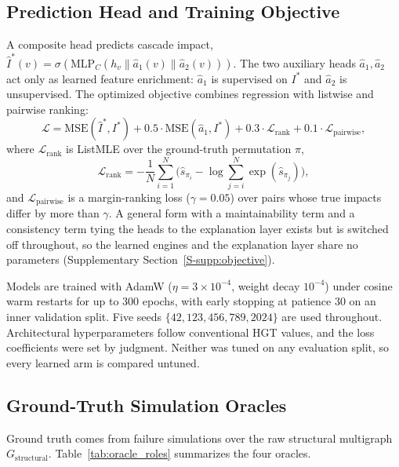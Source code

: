 \documentclass[preprint,3p]{elsarticle}
\begin{document}
\subsection{Prediction Head and Training Objective}
\label{sec:4.2}

A composite head predicts cascade impact, $\hat{I}^*(v) = \sigma(\text{MLP}_C(h_v \parallel \hat{a}_1(v) \parallel \hat{a}_2(v)))$. The two auxiliary heads $\hat{a}_1, \hat{a}_2$ act only as learned feature enrichment: $\hat{a}_1$ is supervised on $I^*$ and $\hat{a}_2$ is unsupervised. The optimized objective combines regression with listwise and pairwise ranking:
\begin{equation}
\label{eq:loss_active}
\mathcal{L} = \text{MSE}(\hat{I}^*, I^*) + 0.5 \cdot \text{MSE}(\hat{a}_1, I^*) + 0.3 \cdot \mathcal{L}_{\text{rank}} + 0.1 \cdot \mathcal{L}_{\text{pairwise}},
\end{equation}
where $\mathcal{L}_{\text{rank}}$ is ListMLE \cite{xia2008listwise} over the ground-truth permutation $\pi$,
\begin{equation}
\label{eq:listmle}
\mathcal{L}_{\text{rank}} = -\frac{1}{N}\sum_{i=1}^N \Big( \hat{s}_{\pi_i} - \log \sum_{j=i}^N \exp(\hat{s}_{\pi_j}) \Big),
\end{equation}
and $\mathcal{L}_{\text{pairwise}}$ is a margin-ranking loss ($\gamma = 0.05$) over pairs whose true impacts differ by more than $\gamma$. A general form with a maintainability term and a consistency term tying the heads to the explanation layer exists but is switched off throughout, so the learned engines and the explanation layer share no parameters (Supplementary Section~\ref{S-supp:objective}).

Models are trained with AdamW ($\eta = 3 \times 10^{-4}$, weight decay $10^{-4}$) under cosine warm restarts for up to 300 epochs, with early stopping at patience 30 on an inner validation split. Five seeds $\{42, 123, 456, 789, 2024\}$ are used throughout. Architectural hyperparameters follow conventional HGT values, and the loss coefficients were set by judgment. Neither was tuned on any evaluation split, so every learned arm is compared untuned.

\subsection{Ground-Truth Simulation Oracles}
\label{sec:4.3}

Ground truth comes from failure simulations over the raw structural multigraph $G_{\text{structural}}$. Table~\ref{tab:oracle_roles} summarizes the four oracles.
\end{document}
